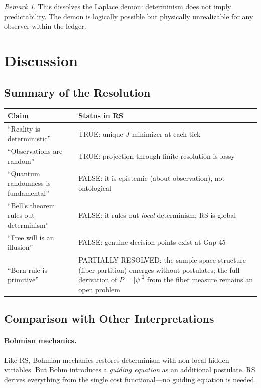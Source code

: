 \documentclass[12pt,a4paper]{article}
\theoremstyle{definition}
\theoremstyle{remark}
\newtheorem{remark}[theorem]{Remark}
\begin{document}
\begin{remark}
This dissolves the Laplace demon: determinism does not imply predictability.
The demon is logically possible but physically unrealizable for any
observer within the ledger.
\end{remark}

\section{Discussion}
\label{sec:discuss}

\subsection{Summary of the Resolution}

\begin{center}
\renewcommand{\arraystretch}{1.3}
\begin{tabular}{@{}p{4.5cm}p{9cm}@{}}
\toprule
\textbf{Claim} & \textbf{Status in RS} \\
\midrule
``Reality is deterministic'' & TRUE: unique $J$-minimizer at each tick \\
``Observations are random'' & TRUE: projection through finite resolution is lossy \\
``Quantum randomness is fundamental'' & FALSE: it is epistemic (about observation), not ontological \\
``Bell's theorem rules out determinism'' & FALSE: it rules out \emph{local} determinism; RS is global \\
``Free will is an illusion'' & FALSE: genuine decision points exist at Gap-45 \\
``Born rule is primitive'' & PARTIALLY RESOLVED: the sample-space structure
(fiber partition) emerges without postulates; the full derivation of
$P = |\psi|^2$ from the fiber measure remains an open problem \\
\bottomrule
\end{tabular}
\end{center}

\subsection{Comparison with Other Interpretations}

\paragraph{Bohmian mechanics.}  Like RS, Bohmian mechanics restores
determinism with non-local hidden variables.  But Bohm introduces a
\emph{guiding equation} as an additional postulate.  RS derives everything
from the single cost functional---no guiding equation is needed.
\end{document}
